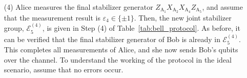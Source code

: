 \documentclass[journal,onecolumn]{IEEEtran}
\begin{document}
\begin{enumerate}
\item[(4)] Alice measures the final stabilizer generator $Z_{\text{A}_1} X_{\text{A}_2} X_{\text{A}_4} Z_{\text{A}_5}$, and %
assume that the measurement result is $\varepsilon_4 \in \{ \pm 1 \}$. %
Then, the new joint stabilizer group, $\mathcal{E}_5^{(4)}$, is given in Step (4) of Table~\ref{tab:bell_protocol}.
As before, it can be verified that the final stabilizer generator of Bob is already in $\mathcal{E}_5^{(4)}$. 
This completes all measurements of Alice, and she now sends Bob's qubits over the channel.
To understand the working of the protocol in the ideal scenario, assume that no errors occur. \\

\end{enumerate}
\end{document}
